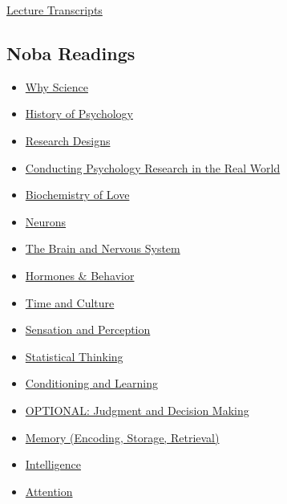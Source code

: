 \documentclass[
]{article}
\providecommand{\tightlist}{%
  \setlength{\itemsep}{0pt}\setlength{\parskip}{0pt}}
\begin{document}
\href{https://utexas.app.box.com/s/gv30palwx7zhqfk43vgvy8450ci0qz66/folder/333986317433}{Lecture Transcripts}

\hypertarget{noba-readings}{%
\subsection{Noba Readings}\label{noba-readings}}

\begin{itemize}
\tightlist
\item
  \href{http://nobaproject.com/modules/why-science}{Why Science}
\item
  \href{http://nobaproject.com/modules/history-of-psychology}{History of Psychology}
\item
  \href{http://nobaproject.com/modules/research-designs}{Research Designs}
\item
  \href{http://nobaproject.com/modules/conducting-psychology-research-in-the-real-world}{Conducting Psychology Research in the Real World}
\item
  \href{http://nobaproject.com/modules/biochemistry-of-love}{Biochemistry of Love}
\item
  \href{http://nobaproject.com/modules/neurons}{Neurons}
\item
  \href{http://nobaproject.com/modules/the-brain-and-nervous-system}{The Brain and Nervous System}
\item
  \href{http://nobaproject.com/modules/hormones-behavior}{Hormones \& Behavior}
\item
  \href{http://nobaproject.com/modules/time-and-culture}{Time and Culture}
\item
  \href{http://nobaproject.com/modules/sensation-and-perception}{Sensation and Perception}
\item
  \href{http://nobaproject.com/modules/statistical-thinking}{Statistical Thinking}
\item
  \href{http://nobaproject.com/modules/conditioning-and-learning}{Conditioning and Learning}
\item
  \href{http://nobaproject.com/modules/judgment-and-decision-making}{OPTIONAL: Judgment and Decision Making}
\item
  \href{http://nobaproject.com/modules/memory-encoding-storage-retrieval}{Memory (Encoding, Storage, Retrieval)}
\item
  \href{http://nobaproject.com/modules/intelligence}{Intelligence}
\item
  \href{http://nobaproject.com/modules/attention}{Attention}

\end{itemize}
\end{document}
